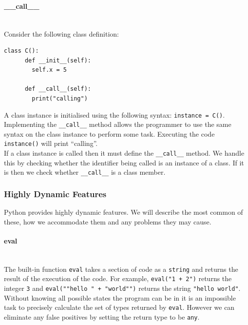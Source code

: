 \documentclass[12pt, titlepage]{article}
\begin{document}
\paragraph*{\_\_call\_\_} \mbox{} \\
Consider the following class definition:
\begin{lstlisting}[mathescape]
    class C():
      def __init__(self):
        self.x = 5
			
      def __call__(self):
        print("calling")
\end{lstlisting}
A class instance is initialised using the following syntax: \texttt{instance = C()}. Implementing the \texttt{\_\_call\_\_} method allows the programmer to use the same syntax on the class instance to perform some task. Executing the code \texttt{instance()} will print ``calling''. \\
\indent If a class instance is called then it must define the \texttt{\_\_call\_\_} method. We handle this by checking whether the identifier being called is an instance of a class. If it is then we check whether \texttt{\_\_call\_\_} is a class member.


\subsubsection{Highly Dynamic Features}
\label{chap:highlyDynamic}
Python provides highly dynamic features. We will describe the most common of these, how we accommodate them and any problems they may cause. 
\paragraph*{eval}\mbox{} \\
The built-in function \texttt{eval} takes a section of code as a \texttt{string} and returns the result of the execution of the code. For example, \texttt{eval("1 + 2")} returns the integer \texttt{3} and  \texttt{eval(""hello " + "world"")} returns the string \texttt{"hello world"}. Without knowing all possible states the program can be in it is an impossible task to precisely calculate the set of types returned by \texttt{eval}. However we can eliminate any false positives by setting the return type to be \texttt{any}.
\end{document}
